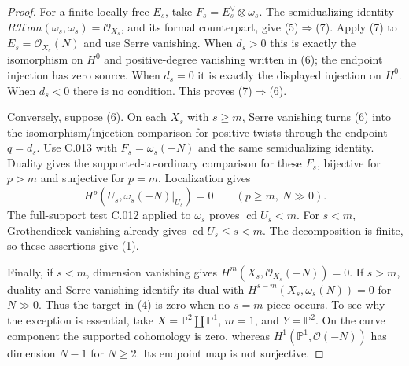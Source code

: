 \begin{proof}
For a finite locally free $E_s$, take
$F_s=E_s^\vee\otimes\omega_s$. The semidualizing identity
$R\mathcal Hom(\omega_s,\omega_s)=\mathcal O_{X_s}$, and its
formal counterpart, give (5)$\Longrightarrow$(7).
Apply (7) to $E_s=\mathcal O_{X_s}(N)$ and use Serre vanishing.
When $d_s>0$ this is exactly the isomorphism on $H^0$ and
positive-degree vanishing written in (6); the endpoint injection
has zero source. When $d_s=0$ it is exactly the displayed
injection on $H^0$. When $d_s<0$ there is no condition. This
proves (7)$\Longrightarrow$(6).

Conversely, suppose (6). On each $X_s$ with $s\ge m$,
Serre vanishing turns (6) into the isomorphism/injection
comparison for positive twists through the endpoint $q=d_s$.
Use C.013 with $F_s=\omega_s(-N)$ and the same semidualizing
identity. Duality gives the supported-to-ordinary comparison
for these $F_s$, bijective for $p>m$ and surjective for $p=m$.
Localization gives
\[
 H^p(U_s,\omega_s(-N)|_{U_s})=0\qquad(p\ge m,\ N\gg0).
\]
The full-support test C.012 applied to $\omega_s$ proves
$\operatorname{cd}U_s<m$. For $s<m$, Grothendieck vanishing
\cite[Proposition 20.20.7, tag 02UZ]{C-stacks}
already gives $\operatorname{cd}U_s\le s<m$. The decomposition
is finite, so these assertions give (1).

Finally, if $s<m$, dimension vanishing gives
$H^m(X_s,\mathcal O_{X_s}(-N))=0$. If $s>m$, duality and
Serre vanishing identify its dual with
$H^{s-m}(X_s,\omega_s(N))=0$ for $N\gg0$. Thus the target in
(4) is zero when no $s=m$ piece occurs. To see why the exception
is essential, take $X=\mathbb P^2\amalg\mathbb P^1$, $m=1$,
and $Y=\mathbb P^2$. On the curve component the supported
cohomology is zero, whereas
$H^1(\mathbb P^1,\mathcal O(-N))$ has dimension $N-1$ for
$N\ge2$. Its endpoint map is not surjective.
\end{proof}
